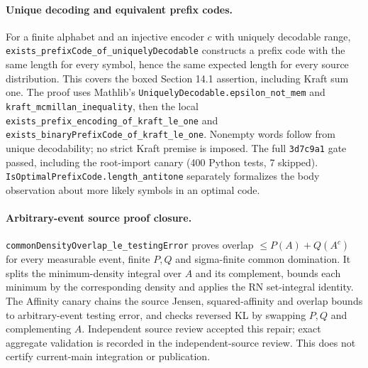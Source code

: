 \paragraph{Unique decoding and equivalent prefix codes.}
For a finite alphabet and an injective encoder $c$ with uniquely decodable
range, \texttt{exists\_prefixCode\_of\_uniquelyDecodable} constructs a prefix
code with the same length for every symbol, hence the same expected length
for every source distribution. This covers the boxed Section 14.1 assertion,
including Kraft sum one. The proof uses Mathlib's
\texttt{UniquelyDecodable.epsilon\_not\_mem} and
\texttt{kraft\_mcmillan\_inequality}, then the local
\texttt{exists\_prefix\_encoding\_of\_kraft\_le\_one} and
\texttt{exists\_binaryPrefixCode\_of\_kraft\_le\_one}.
Nonempty words follow from unique decodability; no strict Kraft premise is
imposed. The full \texttt{3d7c9a1} gate passed, including the root-import
canary (400 Python tests, 7 skipped).
\texttt{IsOptimalPrefixCode.length\_antitone} separately formalizes the body
observation about more likely symbols in an optimal code.

\paragraph{Arbitrary-event source proof closure.}
\texttt{commonDensityOverlap\_\allowbreak le\_\allowbreak testingError}
proves overlap $\le P(A)+Q(A^c)$ for every measurable event, finite $P,Q$
and sigma-finite common domination. It splits the minimum-density integral
over $A$ and its complement, bounds each minimum by the corresponding
density and applies the RN set-integral identity. The Affinity canary chains
the source Jensen, squared-affinity and overlap bounds to arbitrary-event
testing error, and checks reversed KL by swapping $P,Q$ and complementing $A$.
Independent source review accepted this repair; exact aggregate validation
is recorded in the independent-source review. This does not certify
current-main integration or publication.
